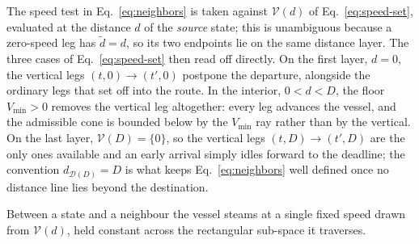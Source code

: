 \documentclass[review,authoryear]{elsarticle}
\begin{document}
The speed test in Eq.~\eqref{eq:neighbors} is taken against $\mathcal{V}(d)$ of
Eq.~\eqref{eq:speed-set}, evaluated at the distance $d$ of the \emph{source} state; this is
unambiguous because a zero-speed leg has $\tilde d=d$, so its two endpoints lie on the same distance
layer. The three cases of Eq.~\eqref{eq:speed-set} then read off directly. On the first layer, $d=0$,
the vertical legs $(t,0)\to(t',0)$ postpone the departure, alongside the ordinary legs that set off
into the route. In the interior, $0<d<D$, the floor $V_{\min}>0$ removes the vertical leg altogether:
every leg advances the vessel, and the admissible cone is bounded below by the $V_{\min}$ ray rather
than by the vertical. On the last layer, $\mathcal{V}(D)=\{0\}$, so the vertical legs
$(t,D)\to(t',D)$ are the only ones available and an early arrival simply idles forward to the
deadline; the convention $d_{\mathcal{D}(D)}=D$ is what keeps Eq.~\eqref{eq:neighbors} well defined
once no distance line lies beyond the destination.

Between a state and a neighbour the vessel steams at a single fixed speed drawn from $\mathcal{V}(d)$, held constant across the rectangular sub-space it traverses.
\end{document}
